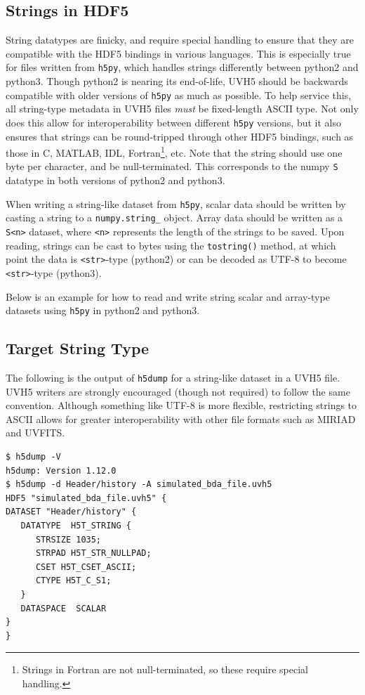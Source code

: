 \documentclass[11pt, oneside]{article}
\begin{document}
\begin{appendices}
\section{Strings in HDF5}
\label{appendix:strings}
String datatypes are finicky, and require special handling to ensure that they
are compatible with the HDF5 bindings in various languages. This is especially
true for files written from \verb+h5py+, which handles strings differently
between python2 and python3. Though python2 is nearing its end-of-life, UVH5
should be backwards compatible with older versions of \verb+h5py+ as much as
possible. To help service this, all string-type metadata in UVH5 files
\textit{must} be fixed-length ASCII type. Not only does this allow for
interoperability between different \verb+h5py+ versions, but it also ensures
that strings can be round-tripped through other HDF5 bindings, such as those in
C, MATLAB, IDL, Fortran\footnote{Strings in Fortran are not null-terminated, so
  these require special handling.}, etc. Note that the string should use one
byte per character, and be null-terminated. This corresponds to the numpy
\verb+S+ datatype in both versions of python2 and python3.

When writing a string-like dataset from \verb+h5py+, scalar data should be
written by casting a string to a \verb+numpy.string_+ object. Array data should
be written as a \verb+S<n>+ dataset, where \verb+<n>+ represents the length of
the strings to be saved. Upon reading, strings can be cast to bytes using the
\verb+tostring()+ method, at which point the data is \verb+<str>+-type (python2)
or can be decoded as UTF-8 to become \verb+<str>+-type (python3).

Below is an example for how to read and write string scalar and array-type
datasets using \verb+h5py+ in python2 and python3.

\subsection{Target String Type}
The following is the output of \texttt{h5dump} for a string-like dataset in a
UVH5 file. UVH5 writers are strongly encouraged (though not required) to follow
the same convention. Although something like UTF-8 is more flexible, restricting
strings to ASCII allows for greater interoperability with other file formats
such as MIRIAD and UVFITS.

\begin{verbatim}
$ h5dump -V
h5dump: Version 1.12.0
$ h5dump -d Header/history -A simulated_bda_file.uvh5
HDF5 "simulated_bda_file.uvh5" {
DATASET "Header/history" {
   DATATYPE  H5T_STRING {
      STRSIZE 1035;
      STRPAD H5T_STR_NULLPAD;
      CSET H5T_CSET_ASCII;
      CTYPE H5T_C_S1;
   }
   DATASPACE  SCALAR
}
}
\end{verbatim}


\end{appendices}
\end{document}
